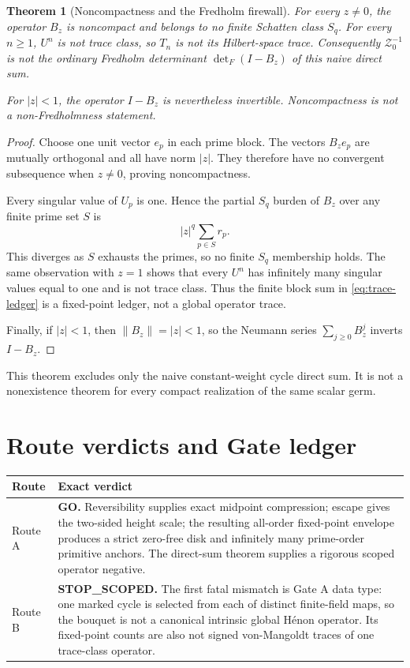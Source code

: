 \documentclass[11pt]{article}
\numberwithin{equation}{section}
\newtheorem{theorem}{Theorem}[section]
\theoremstyle{remark}
\newcommand{\cZ}{\mathcal Z}
\begin{document}
\begin{theorem}[Noncompactness and the Fredholm firewall]
\label{thm:noncompact}
For every \(z\ne0\), the operator \(B_z\) is noncompact and belongs to no
finite Schatten class \(S_q\).  For every \(n\ge1\), \(U^n\) is not trace
class, so \(T_n\) is not its Hilbert-space trace.  Consequently
\(\cZ_0^{-1}\) is not the ordinary Fredholm determinant
\(\det_F(I-B_z)\) of this naive direct sum.

For \(|z|<1\), the operator \(I-B_z\) is nevertheless invertible.
Noncompactness is not a non-Fredholmness statement.
\end{theorem}

\begin{proof}
Choose one unit vector \(e_p\) in each prime block.  The vectors
\(
B_ze_p
\)
are mutually orthogonal and all have norm \(|z|\).  They therefore have no
convergent subsequence when \(z\ne0\), proving noncompactness.

Every singular value of \(U_p\) is one.  Hence the partial \(S_q\) burden of
\(B_z\) over any finite prime set \(S\) is
\begin{equation}
 |z|^q\sum_{p\in S}r_p.
 \label{eq:partial-schatten}
\end{equation}
This diverges as \(S\) exhausts the primes, so no finite \(S_q\) membership
holds.  The same observation with \(z=1\) shows that every \(U^n\) has
infinitely many singular values equal to one and is not trace class.
Thus the finite block sum in \eqref{eq:trace-ledger} is a fixed-point ledger,
not a global operator trace.

Finally, if \(|z|<1\), then \(\|B_z\|=|z|<1\), so the Neumann series
\(
\sum_{j\ge0}B_z^j
\)
inverts \(I-B_z\).
\end{proof}

This theorem excludes only the naive constant-weight cycle direct sum.
It is not a nonexistence theorem for every compact realization of the same
scalar germ.

\section{Route verdicts and Gate ledger}

\begin{center}
\begin{tabular}{p{}p{}}
\toprule
Route & Exact verdict \\
\midrule
Route A & \textbf{GO.}  Reversibility supplies exact midpoint compression;
escape gives the two-sided height scale; the resulting all-order fixed-point
envelope produces a strict zero-free disk and infinitely many prime-order
primitive anchors.  The direct-sum theorem supplies a rigorous scoped
operator negative.\\
Route B & \textbf{STOP\_SCOPED.}  The first fatal mismatch is Gate A data
type: one marked cycle is selected from each of distinct finite-field maps,
so the bouquet is not a canonical intrinsic global H\'enon operator.  Its
fixed-point counts are also not signed von-Mangoldt traces of one trace-class
operator.\\
\bottomrule
\end{tabular}
\end{center}
\end{document}
